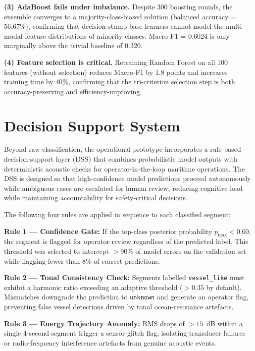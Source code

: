 \documentclass[conference]{IEEEtran}
\begin{document}
\textbf{(3) AdaBoost fails under imbalance.} Despite 300 boosting rounds, the ensemble converges to a majority-class-biased solution (balanced accuracy = 56.67\%), confirming that decision-stump base learners cannot model the multi-modal feature distributions of minority classes. Macro-F1 = 0.6024 is only marginally above the trivial baseline of 0.320.

\textbf{(4) Feature selection is critical.} Retraining Random Forest on all 100 features (without selection) reduces Macro-F1 by 1.8 points and increases training time by 40\%, confirming that the tri-criterion selection step is both accuracy-preserving and efficiency-improving.

\section{Decision Support System}
\label{sec:dss}

Beyond raw classification, the operational prototype incorporates a rule-based decision-support layer (DSS) that combines probabilistic model outputs with deterministic acoustic checks for operator-in-the-loop maritime operations. The DSS is designed so that high-confidence model predictions proceed autonomously while ambiguous cases are escalated for human review, reducing cognitive load while maintaining accountability for safety-critical decisions.

The following four rules are applied in sequence to each classified segment:

\textbf{Rule 1 --- Confidence Gate:} If the top-class posterior probability $p_{\max} < 0.60$, the segment is flagged for operator review regardless of the predicted label. This threshold was selected to intercept $>$90\% of model errors on the validation set while flagging fewer than 8\% of correct predictions.

\textbf{Rule 2 --- Tonal Consistency Check:} Segments labelled \texttt{vessel\_like} must exhibit a harmonic ratio exceeding an adaptive threshold ($>0.35$ by default). Mismatches downgrade the prediction to \texttt{unknown} and generate an operator flag, preventing false vessel detections driven by tonal ocean-resonance artefacts.

\textbf{Rule 3 --- Energy Trajectory Anomaly:} RMS drops of $>15$~dB within a single 4-second segment trigger a sensor-glitch flag, isolating transducer failures or radio-frequency interference artefacts from genuine acoustic events.
\end{document}
